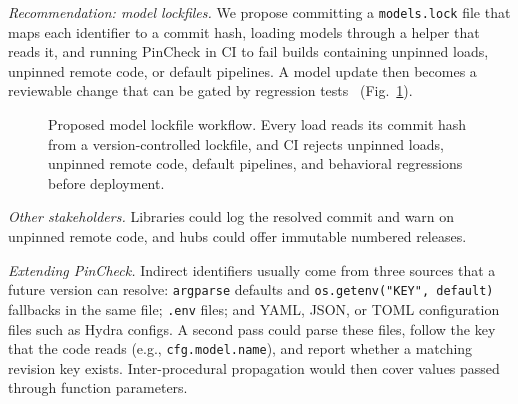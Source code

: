 \documentclass[conference]{IEEEtran}
\begin{document}
\textit{Recommendation: model lockfiles.} We propose committing a \texttt{models.lock} file that maps each identifier to a commit hash, loading models through a helper that reads it, and running PinCheck in CI to fail builds containing unpinned loads, unpinned remote code, or default pipelines. A model update then becomes a reviewable change that can be gated by regression tests~\cite{xie2021, ma2024} (Fig.~\ref{fig:lock}).

\begin{figure}[t]
\centering
{}
\caption{Proposed model lockfile workflow. Every load reads its commit hash from a version-controlled lockfile, and CI rejects unpinned loads, unpinned remote code, default pipelines, and behavioral regressions before deployment.}
\label{fig:lock}
\end{figure}

 \textit{Other stakeholders.} Libraries could log the resolved commit and warn on unpinned remote code, and hubs could offer immutable numbered releases.

\textit{Extending PinCheck.} Indirect identifiers usually come from three sources that a future version can resolve: \texttt{argparse} defaults and \texttt{os.getenv("KEY", default)} fallbacks in the same file; \texttt{.env} files; and YAML, JSON, or TOML configuration files such as Hydra configs. A second pass could parse these files, follow the key that the code reads (e.g., \texttt{cfg.model.name}), and report whether a matching revision key exists. Inter-procedural propagation would then cover values passed through function parameters.
\end{document}
